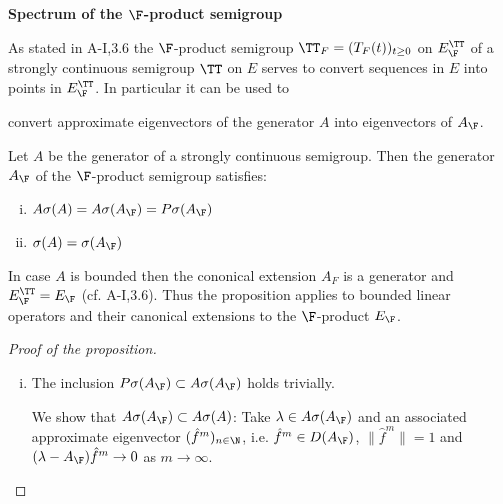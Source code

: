 %
\begin{example}{\textbf{Spectrum of the $\F$-product semigroup}}
\label{ex:a3-4.5}

As stated in A-I,3.6 the $\F$-product semigroup $\TT_{F} = (T_{F}(t))_{t \geq 0}$ on $E_{\F}^{\TT}$ of a strongly continuous semigroup $\TT$ on $E$ serves to convert sequences in $E$ into points in $E_{\F}^{\TT}$.
In particular it can be used to



convert approximate eigenvectors of the generator $A$ into eigenvectors of $A_{\F}$.

\begin{proposition}\label{prop:a3-4.6}

Let $A$ be the generator of a strongly continuous semigroup. Then the generator $A_{\F}$ of the $\F$-product semigroup satisfies:
\begin{enumerate}[(i)]
\item 
$A\sigma(A) = A\sigma(A_{\F}) = P\sigma(A_{\F})$

\item 
$\sigma(A) = \sigma(A_{\F})$
\end{enumerate}
\end{proposition}

\begin{remark}
In case $A$ is bounded then the cononical extension $A_F$ is a generator and $E_{\F}^{\TT} = E_{\F}$ (cf. A-I,3.6).
Thus the proposition applies to bounded linear operators and their canonical extensions to the $\F$-product $E_{\F}$.
\end{remark}

\begin{proof}[Proof of the proposition]
\begin{enumerate}[(i), wide]
\item 
The inclusion $P\sigma(A_{\F}) \subset A\sigma(A_{\F})$ holds trivially.

We show that $A\sigma(A_{\F}) \subset A\sigma(A)$: Take $\lambda \in A\sigma(A_{\F})$ and an associated approximate eigenvector $({\hat{f}^{m}})_{n \in \N}$, i.e. $\hat{f}^{m} \in D(A_{\F})$, $\|\hat{f}^{m}\| = 1$ and $(\lambda-A_{\F})\hat{f}^{m} \to 0$ as $m \to \infty$.


\end{enumerate}
\end{proof}
\end{example}
